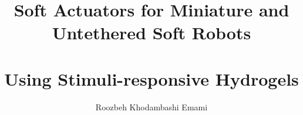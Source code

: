 \documentclass[12pt,letterpaper]{report}
\begin{document}
\title{Soft Actuators for Miniature and Untethered Soft Robots\\ \ \\ Using Stimuli-responsive Hydrogels}
\author{Roozbeh Khodambashi Emami}
\maketitle
 \doublespace

%
\tableofcontents
\newpage

%
%

\end{document}
